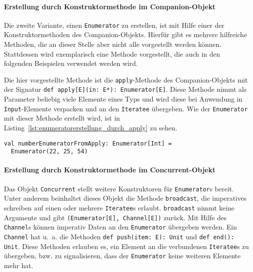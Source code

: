 \paragraph{Erstellung durch Konstruktormethode im Companion-Objekt} %
\label{par:erstellung_durch_konstruktormethode_im_companion-object}\mbox{} %

Die zweite Variante, einen \lstinline|Enumerator| zu erstellen, ist mit Hilfe einer der Konstruktormethoden des Companion-Objekts.
Hierfür gibt es mehrere hilfreiche Methoden, die an dieser Stelle aber nicht alle vorgestellt werden können.
Stattdessen wird exemplarisch eine Methode vorgestellt, die auch in den folgenden Beispielen verwendet werden wird.

Die hier vorgestellte Methode ist die \lstinline|apply|-Methode des Companion-Objekts mit der Signatur \lstinline[breaklines=true]|def apply[E](in: E*): Enumerator[E]|.
Diese Methode nimmt als Parameter beliebig viele Elemente eines Typs und wird diese bei Anwendung in \lstinline|Input|-Elemente verpacken und an den \lstinline|Iteratee| übergeben.
Wie der \lstinline|Enumerator| mit dieser Methode erstellt wird, ist in Listing~\ref{lst:enumeratorerstellung_durch_apply} zu sehen.

\begin{lstlisting}[caption=Erstellung eines Enumerators durch die apply-Konstruktormethode, label=lst:enumeratorerstellung_durch_apply]
val numberEnumeratorFromApply: Enumerator[Int] =
  Enumerator(22, 25, 54)
\end{lstlisting}


\paragraph{Erstellung durch Konstruktormethode im Concurrent-Objekt} %
\label{par:erstellung_durch_konstruktormethode_im_concurrent_objekt}\mbox{} %

Das Objekt \lstinline|Concurrent| stellt weitere Konstruktoren für \lstinline|Enumerator|s bereit.
Unter anderem beinhaltet dieses Objekt die Methode \lstinline|broadcast|, die imperatives schreiben auf einen oder mehrere \lstinline|Iteratee|s erlaubt.
\lstinline|broadcast| nimmt keine Argumente und gibt \lstinline|(Enumerator[E], Channel[E])| zurück.
Mit Hilfe des \lstinline|Channel|s können imperativ Daten an den \lstinline|Enumerator| übergeben werden.
Ein \lstinline|Channel| hat u.~a. die Methoden \lstinline|def push(item: E): Unit| und \lstinline|def end(): Unit|.
Diese Methoden erlauben es, ein Element an die verbundenen \lstinline|Iteratee|s zu übergeben, bzw. zu signalisieren, dass der \lstinline|Enumerator| keine weiteren Elemente mehr hat.

